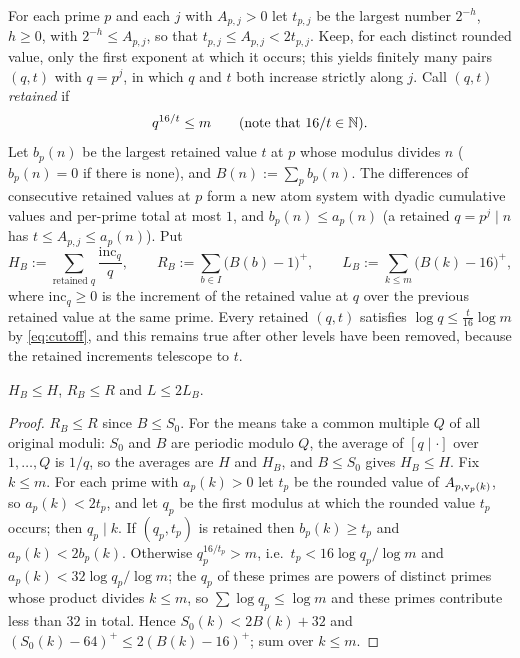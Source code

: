 For each prime $p$ and each $j$ with $A_{p,j}>0$ let $t_{p,j}$ be the largest number $2^{-h}$, $h\ge0$, with $2^{-h}\le A_{p,j}$, so
that $t_{p,j}\le A_{p,j}<2t_{p,j}$. Keep, for each distinct rounded value, only the first exponent at which it occurs; this yields
finitely many pairs $(q,t)$ with $q=p^j$, in which $q$ and $t$ both increase strictly along $j$. Call $(q,t)$ \emph{retained} if
\begin{equation}\label{eq:cutoff}
q^{16/t}\le m\qquad(\text{note that }16/t\in\mathbb{N}).
\end{equation}
Let $b_p(n)$ be the largest retained value $t$ at $p$ whose modulus divides $n$ ($b_p(n)=0$ if there is none), and $B(n):=\sum_pb_p(n)$.
The differences of consecutive retained values at $p$ form a new atom system with dyadic cumulative values and per-prime total at
most $1$, and $b_p(n)\le a_p(n)$ (a retained $q=p^j\mid n$ has $t\le A_{p,j}\le a_p(n)$). Put
\[
H_B:=\sum_{\text{retained }q}\frac{\mathrm{inc}_q}{q},\qquad R_B:=\sum_{b\in I}\bigl(B(b)-1\bigr)^+,\qquad L_B:=\sum_{k\le m}\bigl(B(k)-16\bigr)^+,
\]
where $\mathrm{inc}_q\ge0$ is the increment of the retained value at $q$ over the previous retained value at the same prime. Every
retained $(q,t)$ satisfies $\log q\le\tfrac t{16}\log m$ by \eqref{eq:cutoff}, and this remains true after other levels have been
removed, because the retained increments telescope to $t$.

\begin{lemma}[rounding]\label{lem:rounding}
$H_B\le H$, $R_B\le R$ and $L\le2L_B$.
\end{lemma}
\begin{proof}
$R_B\le R$ since $B\le S_0$. For the means take a common multiple $Q$ of all original moduli: $S_0$ and $B$ are periodic modulo $Q$,
the average of $[q\mid\cdot]$ over $1,\dots,Q$ is $1/q$, so the averages are $H$ and $H_B$, and $B\le S_0$ gives $H_B\le H$.
Fix $k\le m$. For each prime with $a_p(k)>0$ let $t_p$ be the rounded value of $A_{p,\operatorname{v}_p(k)}$, so $a_p(k)<2t_p$, and let $q_p$ be
the first modulus at which the rounded value $t_p$ occurs; then $q_p\mid k$. If $(q_p,t_p)$ is retained then $b_p(k)\ge t_p$ and
$a_p(k)<2b_p(k)$. Otherwise $q_p^{16/t_p}>m$, i.e.\ $t_p<16\log q_p/\log m$ and $a_p(k)<32\log q_p/\log m$; the $q_p$ of these primes
are powers of distinct primes whose product divides $k\le m$, so $\sum\log q_p\le\log m$ and these primes contribute less than $32$
in total. Hence $S_0(k)<2B(k)+32$ and $(S_0(k)-64)^+\le2(B(k)-16)^+$; sum over $k\le m$.
\end{proof}

